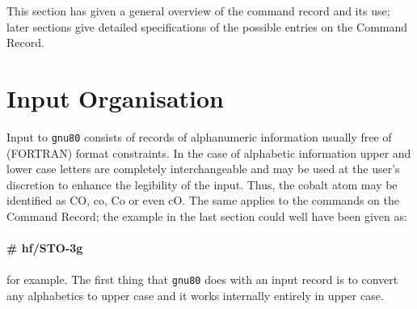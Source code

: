 This section has given a general overview of the command
record and its use; later sections give detailed
specifications of the possible entries on the Command Record.
\section{\sf Input Organisation}
\label{inorg}
Input to {\tt gnu80} consists of records of alphanumeric information
usually free of (FORTRAN) format constraints. In the case of alphabetic
information upper and lower case letters are completely interchangeable
and may be used at the user's discretion to enhance the legibility of
the input. Thus, the cobalt atom may be identified as CO, co, Co or even
cO. The same applies to the commands on the Command Record; the example in
the last section could well have been given as:
\\
\vspace{0.5cm}
\\
{\bf \# hf/STO-3g}
\\
\vspace{0.5cm}
\\
for example. The first thing that {\tt gnu80} does with an input record
is to convert any alphabetics to upper case and it works internally entirely
in upper case.

\begin{center}
\end{center}
 
